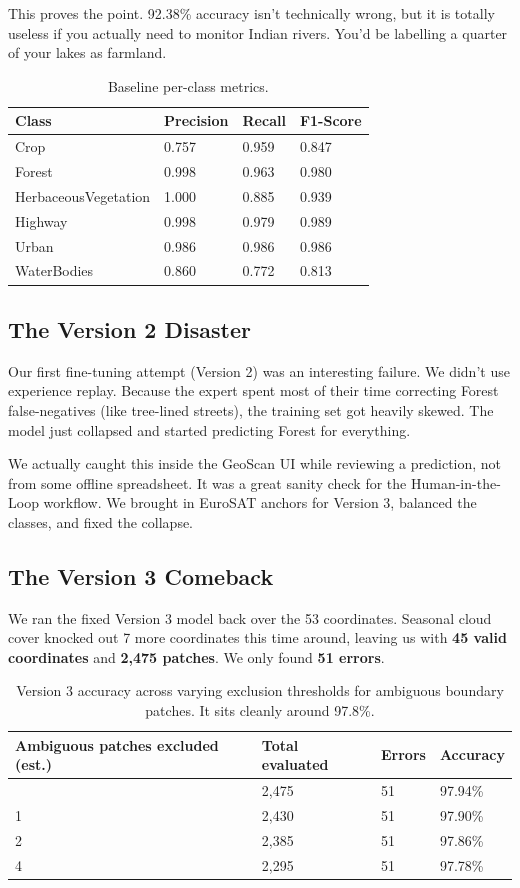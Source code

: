 \documentclass[journal]{IEEEtran}
\begin{document}
This proves the point. 92.38\% accuracy isn't technically wrong, but it
is totally useless if you actually need to monitor Indian rivers. You'd
be labelling a quarter of your lakes as farmland.

\begin{longtable}[]{@{}llll@{}}
\caption{Baseline per-class metrics.}\\
\toprule\noalign{}
Class & Precision & Recall & F1-Score \\
\midrule\noalign{}
\endhead
\bottomrule\noalign{}
\endlastfoot
Crop & 0.757 & 0.959 & 0.847 \\
Forest & 0.998 & 0.963 & 0.980 \\
HerbaceousVegetation & 1.000 & 0.885 & 0.939 \\
Highway & 0.998 & 0.979 & 0.989 \\
Urban & 0.986 & 0.986 & 0.986 \\
WaterBodies & 0.860 & 0.772 & 0.813 \\
\end{longtable}

\subsection{The Version 2 Disaster}

Our first fine-tuning attempt (Version 2) was an interesting failure. We
didn't use experience replay. Because the expert spent most of their
time correcting Forest false-negatives (like tree-lined streets), the
training set got heavily skewed. The model just collapsed and started
predicting Forest for everything.

We actually caught this inside the GeoScan UI while reviewing a
prediction, not from some offline spreadsheet. It was a great sanity
check for the Human-in-the-Loop workflow. We brought in EuroSAT anchors
for Version 3, balanced the classes, and fixed the collapse.

\subsection{The Version 3 Comeback}

We ran the fixed Version 3 model back over the 53 coordinates. Seasonal
cloud cover knocked out 7 more coordinates this time around, leaving us
with \textbf{45 valid coordinates} and \textbf{2,475 patches}. We only
found \textbf{51 errors}.

\begin{longtable}[]{@{}llll@{}}
\caption{Version 3 accuracy across varying exclusion thresholds for
ambiguous boundary patches. It sits cleanly around 97.8\%.}\\
\toprule\noalign{}
Ambiguous patches excluded (est.) & Total evaluated & Errors & Accuracy \\
\midrule\noalign{}
\endhead
\bottomrule\noalign{}
\endlastfoot
0 & 2,475 & 51 & 97.94\% \\
1 & 2,430 & 51 & 97.90\% \\
2 & 2,385 & 51 & 97.86\% \\
4 & 2,295 & 51 & 97.78\% \\
\end{longtable}
\end{document}
